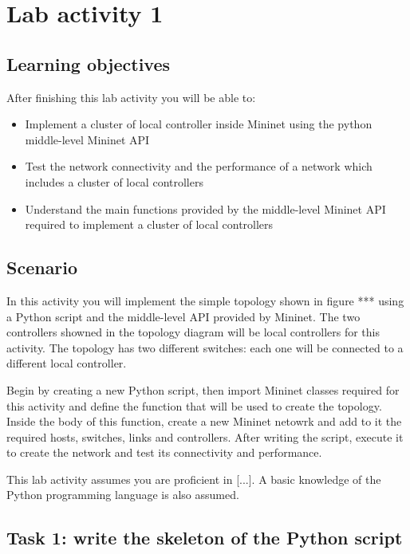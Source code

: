 \section*{Lab activity 1}





\subsection*{Learning objectives}
After finishing this lab activity you will be able to:
\begin{itemize}
  \item Implement a cluster of local controller inside Mininet using the python
  middle-level Mininet API
  \item Test the network connectivity and the performance of a network which
  includes a cluster of local controllers
  \item Understand the main functions provided by the middle-level Mininet API required
  to implement a cluster of local controllers
\end{itemize}






\subsection*{Scenario}
In this activity you will implement the simple topology shown in figure *** using
a Python script and the middle-level API provided by Mininet. The two controllers
showned in the topology diagram will be local controllers for this activity.
The topology has two different switches: each one will be connected to a different
local controller.

Begin by creating a new Python script, then import Mininet classes required for
this activity and define the function that will be used to create the topology.
Inside the body of this function, create a new Mininet netowrk and add to it the
required hosts, switches, links and controllers. After writing the script, execute
it to create the network and test its connectivity and performance.

This lab activity assumes you are proficient in [...]. A basic knowledge of the
Python programming language is also assumed.





\subsection*{Task 1: write the skeleton of the Python script}
